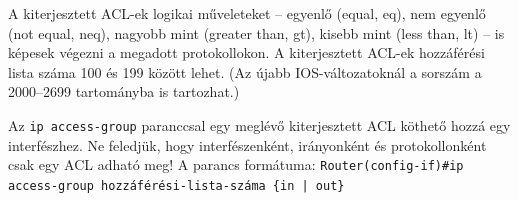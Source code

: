 A kiterjesztett ACL-ek logikai műveleteket – egyenlő (equal, eq), nem egyenlő (not equal,
neq), nagyobb mint (greater than, gt), kisebb mint (less than, lt) – is képesek végezni a
megadott protokollokon. A kiterjesztett ACL-ek hozzáférési lista száma 100 és 199 között
lehet. (Az újabb IOS-változatoknál a sorszám a 2000–2699 tartományba is tartozhat.)

Az \verb|ip access-group| paranccsal egy meglévő kiterjesztett ACL köthető hozzá egy interfészhez.
Ne feledjük, hogy interfészenként, irányonként és protokollonként csak egy ACL adható meg!
A parancs formátuma: \verb+Router(config-if)#ip access-group hozzáférési-lista-száma {in | out}+

